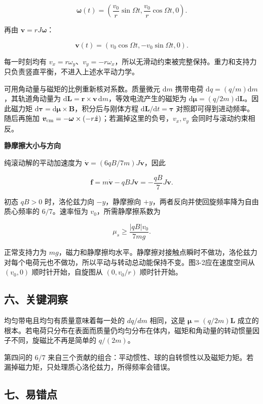 \documentclass[12pt,a4paper,UTF8]{ctexart}
\begin{document}
\[\boxed{
\bm\omega(t)=
\left(
\frac{v_0}{r}\sin\Omega t,
\frac{v_0}{r}\cos\Omega t,
0
\right)
}.\]

再由 \(\bm v=rJ\bm\omega\)：

\[\boxed{
\bm v(t)=
\left(
v_0\cos\Omega t,
-v_0\sin\Omega t,
0
\right)
}.\]

每一时刻均有
\(v_x=r\omega_y\)、\(v_y=-r\omega_x\)，所以无滑动约束被完整保持。重力和支持力只负责竖直平衡，不进入上述水平动力学。

可用角动量与磁矩的比例重新核对系数。质量微元 \(\mathrm{d}m\) 携带电荷
\(\mathrm{d}q=(q/m)\mathrm{d}m\)，其轨道角动量为
\(\mathrm{d}\bm L=\bm r\times\bm v\,\mathrm{d}m\)，等效电流产生的磁矩为
\(\mathrm{d}\bm\mu=(q/2m)\mathrm{d}\bm L\)。因此磁力矩
\(\mathrm{d}\bm\tau=\mathrm{d}\bm\mu\times\bm B\)，积分后与刚体方程
\(\mathrm{d}\bm L/\mathrm{d}t=\bm\tau\) 对照即可得到进动频率。随后再施加
\(\bm v_{\rm cm}=-\bm\omega\times(-r\hat{\bm z})\)；若漏掉这里的负号，\(v_x,v_y\)
会同时与滚动约束相反。

\textbf{静摩擦大小与方向}

纯滚动解的平动加速度为 \(\dot{\bm v}=(6qB/7m)J\bm v\)，因此

\[\bm f=m\dot{\bm v}-qBJ\bm v=-\frac{qB}{7}J\bm v.\]

初态 \(qB>0\) 时，洛伦兹力向 \(-y\)，静摩擦向
\(+y\)，两者反向并使回旋频率降为自由质心频率的 \(6/7\)。速率恒为
\(v_0\)，所需静摩擦系数为

\[\mu_s\ge\frac{|qB|v_0}{7mg}.\]

正常支持力为
\(mg\)，磁力和静摩擦均水平。静摩擦对接触点瞬时不做功，洛伦兹力对每个电荷元也不做功，所以平动与转动总动能保持不变。图3-2应在速度空间从
\((v_0,0)\) 顺时针开始，自旋图从 \((0,v_0/r)\) 顺时针开始。

\subsection{六、关键洞察}\label{ux516dux5173ux952eux6d1eux5bdf-2}

均匀带电且均匀有质量意味着每一处的 \(dq/dm\) 相同，这是
\(\bm\mu=(q/2m)\bm L\)
成立的根本。若电荷只分布在表面而质量仍均匀分布在体内，磁矩和角动量的转动惯量因子不同，旋磁比不再是简单的
\(q/(2m)\)。

第四问的 \(6/7\)
来自三个贡献的组合：平动惯性、球的自转惯性以及磁矩力矩。若漏掉磁力矩，只处理质心洛伦兹力，所得频率会错误。

\subsection{七、易错点}\label{ux4e03ux6613ux9519ux70b9-2}
\end{document}
